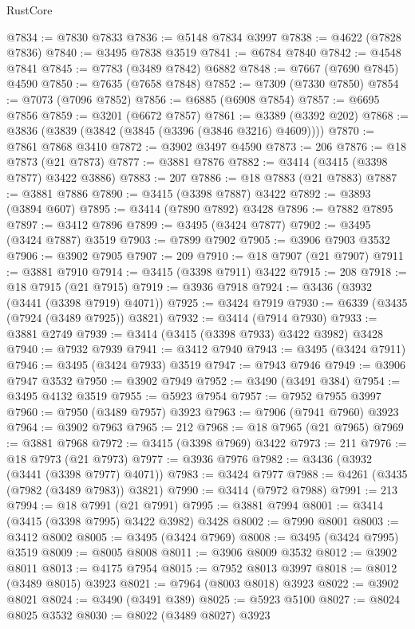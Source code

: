 \begin{lexlean}{RustCore}
\begin{coremodule}
@7834 := @7830 @7833
@7836 := @5148 @7834 @3997
@7838 := @4622 (@7828 @7836)
@7840 := @3495 @7838 @3519
@7841 := @6784 @7840
@7842 := @4548 @7841
@7845 := @7783 (@3489 @7842) @6882
@7848 := @7667 (@7690 @7845) @4590
@7850 := @7635 (@7658 @7848)
@7852 := @7309 (@7330 @7850)
@7854 := @7073 (@7096 @7852)
@7856 := @6885 (@6908 @7854)
@7857 := @6695 @7856
@7859 := @3201 (@6672 @7857)
@7861 := @3389 (@3392 @202)
@7868 := @3836 (@3839 (@3842 (@3845 (@3396 (@3846 @3216) @4609))))
@7870 := @7861 @7868 @3410
@7872 := @3902 @3497 @4590
@7873 := 206
@7876 := @18 @7873 (@21 @7873)
@7877 := @3881 @7876
@7882 := @3414 (@3415 (@3398 @7877) @3422 @3886)
@7883 := 207
@7886 := @18 @7883 (@21 @7883)
@7887 := @3881 @7886
@7890 := @3415 (@3398 @7887) @3422
@7892 := @3893 (@3894 @607)
@7895 := @3414 (@7890 @7892) @3428
@7896 := @7882 @7895
@7897 := @3412 @7896
@7899 := @3495 (@3424 @7877)
@7902 := @3495 (@3424 @7887) @3519
@7903 := @7899 @7902
@7905 := @3906 @7903 @3532
@7906 := @3902 @7905
@7907 := 209
@7910 := @18 @7907 (@21 @7907)
@7911 := @3881 @7910
@7914 := @3415 (@3398 @7911) @3422
@7915 := 208
@7918 := @18 @7915 (@21 @7915)
@7919 := @3936 @7918
@7924 := @3436 (@3932 (@3441 (@3398 @7919) @4071))
@7925 := @3424 @7919
@7930 := @6339 (@3435 (@7924 (@3489 @7925)) @3821)
@7932 := @3414 (@7914 @7930)
@7933 := @3881 @2749
@7939 := @3414 (@3415 (@3398 @7933) @3422 @3982) @3428
@7940 := @7932 @7939
@7941 := @3412 @7940
@7943 := @3495 (@3424 @7911)
@7946 := @3495 (@3424 @7933) @3519
@7947 := @7943 @7946
@7949 := @3906 @7947 @3532
@7950 := @3902 @7949
@7952 := @3490 (@3491 @384)
@7954 := @3495 @4132 @3519
@7955 := @5923 @7954
@7957 := @7952 @7955 @3997
@7960 := @7950 (@3489 @7957) @3923
@7963 := @7906 (@7941 @7960) @3923
@7964 := @3902 @7963
@7965 := 212
@7968 := @18 @7965 (@21 @7965)
@7969 := @3881 @7968
@7972 := @3415 (@3398 @7969) @3422
@7973 := 211
@7976 := @18 @7973 (@21 @7973)
@7977 := @3936 @7976
@7982 := @3436 (@3932 (@3441 (@3398 @7977) @4071))
@7983 := @3424 @7977
@7988 := @4261 (@3435 (@7982 (@3489 @7983)) @3821)
@7990 := @3414 (@7972 @7988)
@7991 := 213
@7994 := @18 @7991 (@21 @7991)
@7995 := @3881 @7994
@8001 := @3414 (@3415 (@3398 @7995) @3422 @3982) @3428
@8002 := @7990 @8001
@8003 := @3412 @8002
@8005 := @3495 (@3424 @7969)
@8008 := @3495 (@3424 @7995) @3519
@8009 := @8005 @8008
@8011 := @3906 @8009 @3532
@8012 := @3902 @8011
@8013 := @4175 @7954
@8015 := @7952 @8013 @3997
@8018 := @8012 (@3489 @8015) @3923
@8021 := @7964 (@8003 @8018) @3923
@8022 := @3902 @8021
@8024 := @3490 (@3491 @389)
@8025 := @5923 @5100
@8027 := @8024 @8025 @3532
@8030 := @8022 (@3489 @8027) @3923

\end{coremodule}
\end{lexlean}
